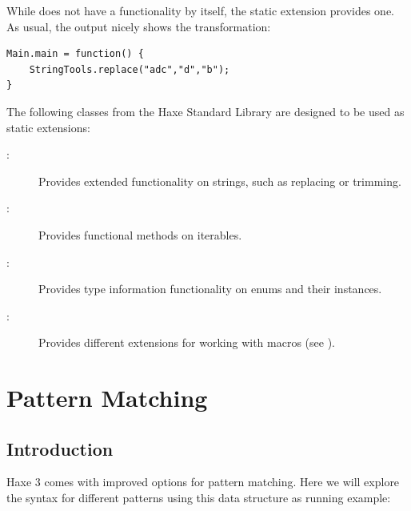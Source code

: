 \documentclass{haxe}
\begin{document}

While  does not have a  functionality by itself, the  static extension provides one. As usual, the  output nicely shows the transformation:

\begin{lstlisting}
Main.main = function() {
	StringTools.replace("adc","d","b");
}
\end{lstlisting}

The following classes from the Haxe Standard Library are designed to be used as static extensions:

\begin{description}
	\item[:] Provides extended functionality on strings, such as replacing or trimming.
	\item[:] Provides functional methods on iterables.
	\item[:] Provides type information functionality on enums and their instances.
	\item[:] Provides different extensions for working with macros (see ).
\end{description}






\section{Pattern Matching}
\label{lf-pattern-matching}

\subsection{Introduction}
\label{lf-pattern-matching-introduction}

Haxe 3 comes with improved options for pattern matching. Here we will explore the syntax for different patterns using this data structure as running example:
\end{document}
